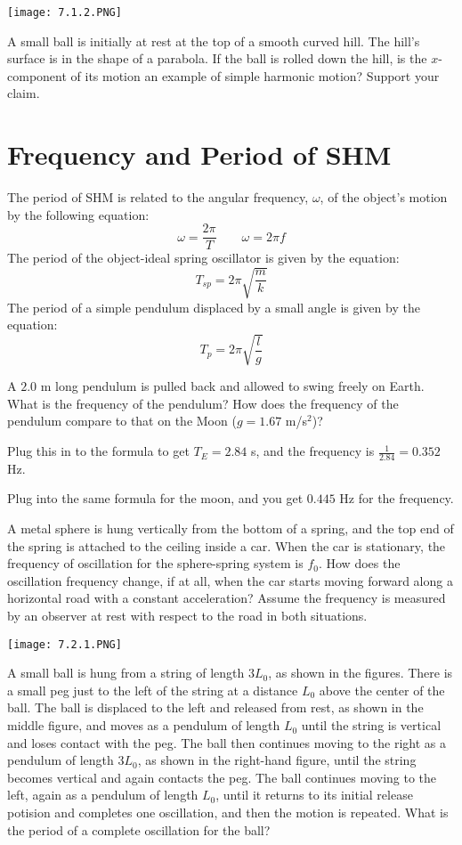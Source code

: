 \documentclass[../mech.tex]{subfiles}
\begin{document}
\pagebreak
\ex \begin{center}
    \texttt{[image: 7.1.2.PNG]}
\end{center}
A small ball is initially at rest at the top of a smooth curved hill. The hill's surface is in the shape of a parabola. If the ball is rolled down the hill, is the $x$-component of its motion an example of simple harmonic motion? Support your claim.

\section{Frequency and Period of SHM}
The period of SHM is related to the angular frequency, $\omega$, of the object's motion by the following equation:
\[ \omega = \frac{2\pi}{T} \qquad \omega = 2\pi f \]
The period of the object-ideal spring oscillator is given by the equation:
\[ T_{sp}=2\pi \sqrt{\frac{m}{k}} \]
The period of a simple pendulum displaced by a small angle is given by the equation:
\[ T_{p}=2\pi \sqrt{\frac{l}{g}} \]

\begin{example}
    A $2.0$ m long pendulum is pulled back and allowed to swing freely on Earth. What is the frequency of the pendulum? How does the frequency of the pendulum compare to that on the Moon ($g=1.67$ m/s$^2$)?

    Plug this in to the formula to get $T_E=2.84$ s, and the frequency is $\frac{1}{2.84} = 0.352$ Hz.

    Plug into the same formula for the moon, and you get $0.445$ Hz for the frequency.
\end{example}

\ex A metal sphere is hung vertically from the bottom of a spring, and the top end of the spring is attached to the ceiling inside a car. When the car is stationary, the frequency of oscillation for the sphere-spring system is $f_0$. How does the oscillation frequency change, if at all, when the car 
starts moving forward along a horizontal road with a constant acceleration? Assume the frequency is measured by an observer at rest with respect to the road in both situations.

\pagebreak
\ex \begin{center}
    \texttt{[image: 7.2.1.PNG]}
\end{center}
A small ball is hung from a string of length $3L_0$, as shown in the figures. There is a small peg just to the left of the string at a distance $L_0$ above the center of the ball. The ball is displaced to the left and released from rest, as shown in the middle figure, and moves 
as a pendulum of length $L_0$ until the string is vertical and loses contact with the peg. The ball then continues moving to the right as a pendulum of length $3L_0$, as shown in the right-hand figure, until the string becomes vertical and again contacts the peg. The ball continues moving to the left, 
again as a pendulum of length $L_0$, until it returns to its initial release potision and completes one oscillation, and then the motion is repeated. What is the period of a complete oscillation for the ball?
\end{document}

